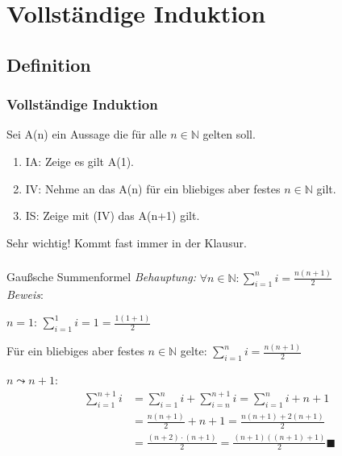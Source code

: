 \section{Vollständige Induktion}
\subsection{Definition}
\begin{frame}
  \frametitle{Vollständige Induktion}
  \begin{definition}
    Sei A(n) ein Aussage die für alle $n \in \mathbb{N}$ gelten soll.
    \begin{enumerate}
      \item IA: Zeige es gilt A(1).
      \item IV: Nehme an das A(n) für ein bliebiges aber festes $n \in \mathbb{N}$ gilt.
      \item IS: Zeige mit (IV) das A(n+1) gilt.
    \end{enumerate}
  \end{definition}
  \begin{alertblock}{Sehr wichtig!}
    Kommt fast immer in der Klausur.
  \end{alertblock}
\end{frame}
\begin{frame}[plain]
  \frametitle{}
  \begin{exampleblock}{Gaußsche Summenformel}
    \emph{Behauptung:} $\forall n \in \mathbb{N}: \sum \limits^{n}_{i=1} i = \frac{n(n+1)}{2}$\pause\\
    \emph{Beweis}:
    \begin{description}{}
      {\tiny
      \item[IA:] $n = 1$: $\sum \limits^{1}_{i=1} i = 1 = \frac{1(1+1)}{2}$
      \item[IV:] Für ein bliebiges aber festes $n \in \mathbb{N}$ gelte: $\sum \limits^{n}_{i=1} i = \frac{n(n+1)}{2}$
      \item[IS:] $n \leadsto n+1$:
        \begin{align*}
          \sum \limits^{n+1}_{i=1} i &= \sum \limits^{n}_{i=1} i + \sum \limits^{n+1}_{i=n} i
          = \sum \limits^{n}_{i=1} i + n+1\\
          &= \frac{n(n+1)}{2} + n+1 = \frac{n(n+1) + 2(n+1)}{2}\\
          &= \frac{(n+2) \cdot (n+1)}{2} = \frac{(n+1)((n+1)+1)}{2} \blacksquare
        \end{align*}
       }
    \end{description}
  \end{exampleblock}
\end{frame}

